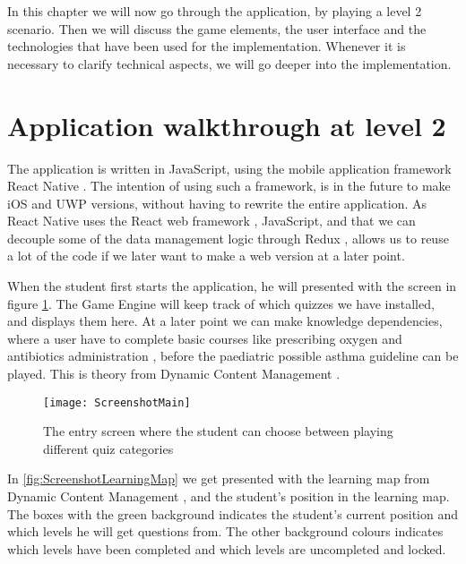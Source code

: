 In this chapter we will now go through the application, by playing a level 2 scenario. Then we will discuss the game elements, the user interface and the technologies that have been used for the implementation. Whenever it is necessary to clarify technical aspects, we will go deeper into the implementation.

\section{Application walkthrough at level 2}




The application is written in JavaScript, using the mobile application framework React Native \parencite{ReactNative}. The intention of using such a framework, is in the future to make iOS and UWP versions, without having to rewrite the entire application. As React Native uses the React web framework \parencite{React}, JavaScript, and that we can decouple some of the data management logic through Redux \parencite{Redux}, allows us to reuse a lot of the code if we later want to make a web version at a later point.

When the student first starts the application, he will presented with the screen in figure \ref{fig:ScreenshotMain}. The Game Engine will keep track of which quizzes we have installed, and displays them here. At a later point we can make knowledge dependencies, where a user have to complete basic courses like prescribing oxygen \parencite{RepublicofKeny2016} and antibiotics administration \parencite{RepublicofKeny2016}, before the paediatric possible asthma guideline \parencite{RepublicofKeny2016} can be played. This is theory from Dynamic Content Management \parencite{Eide2008}.

\begin{figure}[h!]
	\texttt{[image: ScreenshotMain]}
	\caption {The entry screen where the student can choose between playing different quiz categories}
	\label{fig:ScreenshotMain}
\end{figure}

In \ref{fig:ScreenshotLearningMap} we get presented with the learning map from Dynamic Content Management \parencite{Eide2008}, and the student's position in the learning map. The boxes with the green background indicates the student's current position and which levels he will get questions from. The other background colours indicates which levels have been completed and which levels are uncompleted and locked. 

